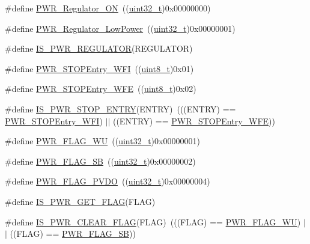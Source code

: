 \begin{DoxyCompactItemize}
\item 
\#define \hyperlink{group___regulator__state__is___s_t_o_p__mode_gabf58b999bff6b4bf0fb5b97d74a75683}{P\+W\+R\+\_\+\+Regulator\+\_\+\+ON}~((\hyperlink{_p_e___types_8h_a33594304e786b158f3fb30289278f5af}{uint32\+\_\+t})0x00000000)
\item 
\#define \hyperlink{group___regulator__state__is___s_t_o_p__mode_ga13745136d094661358d373b67ebf1ac7}{P\+W\+R\+\_\+\+Regulator\+\_\+\+Low\+Power}~((\hyperlink{_p_e___types_8h_a33594304e786b158f3fb30289278f5af}{uint32\+\_\+t})0x00000001)
\item 
\#define \hyperlink{group___regulator__state__is___s_t_o_p__mode_ga03c105070272141c0bab5f2b74469072}{I\+S\+\_\+\+P\+W\+R\+\_\+\+R\+E\+G\+U\+L\+A\+T\+OR}(R\+E\+G\+U\+L\+A\+T\+OR)
\item 
\#define \hyperlink{group___s_t_o_p__mode__entry_gaa1e1362f3d0b93e8f5f674e18cfc96c4}{P\+W\+R\+\_\+\+S\+T\+O\+P\+Entry\+\_\+\+W\+FI}~((\hyperlink{_p_e___types_8h_aba7bc1797add20fe3efdf37ced1182c5}{uint8\+\_\+t})0x01)
\item 
\#define \hyperlink{group___s_t_o_p__mode__entry_gaac98ac55fb8764121d4168d99c9b369e}{P\+W\+R\+\_\+\+S\+T\+O\+P\+Entry\+\_\+\+W\+FE}~((\hyperlink{_p_e___types_8h_aba7bc1797add20fe3efdf37ced1182c5}{uint8\+\_\+t})0x02)
\item 
\#define \hyperlink{group___s_t_o_p__mode__entry_ga4a94eb1f400dec6e486fbc229cbea8a0}{I\+S\+\_\+\+P\+W\+R\+\_\+\+S\+T\+O\+P\+\_\+\+E\+N\+T\+RY}(E\+N\+T\+RY)~(((E\+N\+T\+RY) == \hyperlink{openmotestm_2library_2inc_2stm32f10x__pwr_8h_aa1e1362f3d0b93e8f5f674e18cfc96c4}{P\+W\+R\+\_\+\+S\+T\+O\+P\+Entry\+\_\+\+W\+FI}) $\vert$$\vert$ ((E\+N\+T\+RY) == \hyperlink{openmotestm_2library_2inc_2stm32f10x__pwr_8h_aac98ac55fb8764121d4168d99c9b369e}{P\+W\+R\+\_\+\+S\+T\+O\+P\+Entry\+\_\+\+W\+FE}))
\item 
\#define \hyperlink{group___p_w_r___flag_ga2d06760a5769e729b06d41e37036d58e}{P\+W\+R\+\_\+\+F\+L\+A\+G\+\_\+\+WU}~((\hyperlink{_p_e___types_8h_a33594304e786b158f3fb30289278f5af}{uint32\+\_\+t})0x00000001)
\item 
\#define \hyperlink{group___p_w_r___flag_ga9e55f0b5dec2346d5c8dee3ab3c0c2df}{P\+W\+R\+\_\+\+F\+L\+A\+G\+\_\+\+SB}~((\hyperlink{_p_e___types_8h_a33594304e786b158f3fb30289278f5af}{uint32\+\_\+t})0x00000002)
\item 
\#define \hyperlink{group___p_w_r___flag_gaefd05d58cc050eeef83a1b5c520b2c2a}{P\+W\+R\+\_\+\+F\+L\+A\+G\+\_\+\+P\+V\+DO}~((\hyperlink{_p_e___types_8h_a33594304e786b158f3fb30289278f5af}{uint32\+\_\+t})0x00000004)
\item 
\#define \hyperlink{group___p_w_r___flag_gadc822638d0dd52d2f920808dd96c00a1}{I\+S\+\_\+\+P\+W\+R\+\_\+\+G\+E\+T\+\_\+\+F\+L\+AG}(F\+L\+AG)
\item 
\#define \hyperlink{group___p_w_r___flag_ga36d35a770e683e4a0baf3aac350fcb5a}{I\+S\+\_\+\+P\+W\+R\+\_\+\+C\+L\+E\+A\+R\+\_\+\+F\+L\+AG}(F\+L\+AG)~(((F\+L\+AG) == \hyperlink{openmotestm_2library_2inc_2stm32f10x__pwr_8h_a2d06760a5769e729b06d41e37036d58e}{P\+W\+R\+\_\+\+F\+L\+A\+G\+\_\+\+WU}) $\vert$$\vert$ ((F\+L\+AG) == \hyperlink{openmotestm_2library_2inc_2stm32f10x__pwr_8h_a9e55f0b5dec2346d5c8dee3ab3c0c2df}{P\+W\+R\+\_\+\+F\+L\+A\+G\+\_\+\+SB}))
\end{DoxyCompactItemize}
